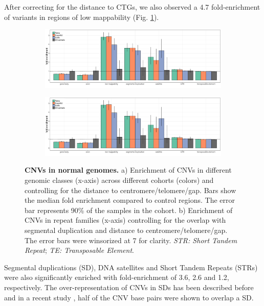 After correcting for the distance to CTGs, we also observed a 4.7 fold-enrichment of variants in regions of low mappability (Fig. \ref{fig:repAll}).
\begin{figure}[htp]
  \centering
  \begin{subfigure}{.9\textwidth}
  \includegraphics[width=\textwidth, page=1]{figures/PopSV-repeatEnr-long.pdf}
  \caption{}
  \label{fig:repAll}
  \end{subfigure}
  \begin{subfigure}{.9\textwidth}
  \includegraphics[width=\textwidth, page=3]{figures/PopSV-repeatEnr-long.pdf}
  \caption{}
  \label{fig:repFam}
  \end{subfigure}
  \caption[CNVs in normal genomes.]{{\bf CNVs in normal genomes.} {\small a) Enrichment of CNVs in different genomic classes (x-axis) across different cohorts (colors) and controlling for the distance to centromere/telomere/gap. Bars show the median fold enrichment compared to control regions. The error bar represents 90\% of the samples in the cohort. b) Enrichment of CNVs in repeat families (x-axis) controlling for the overlap with segmental duplication and distance to centromere/telomere/gap. The error bars were winsorized at 7 for clarity. {\it STR: Short Tandem Repeat}; {\it TE: Transposable Element}.
    }}
\end{figure}
Segmental duplications (SD), DNA satellites and Short Tandem Repeats (STRs) were also significantly enriched with fold-enrichment of 3.6, 2.6 and 1.2, respectively.
The over-representation of CNVs in SDs has been described before\cite{Sharp2006} and in a recent study \cite{Sudmant2015}, half of the CNV base pairs were shown to overlap a SD.
